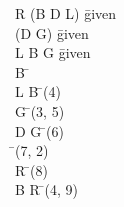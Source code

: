 \documentclass{article}
\begin{document}
\begin{proofbox}
\: R \rightarrow (B \rightarrow D \lor L) \= \hbox{given} \\
\: \lnot (D \lor G) \= \hbox{given} \\
\: L \lor B \rightarrow G \= \hbox{given} \\
\open
\: B \= \asm \\
\: L \lor B \= \orintro(4) \\
\: G \= \implieselim(3, 5) \\
\: D \lor G \= \orintro(6) \\
\: \bot \= \bottomintro(7, 2) \\
\: \lnot R \= \bottomelim(8) \\
\close
\: B \rightarrow \lnot R \= \impliesintro(4, 9) \\
\end{proofbox}
\end{document}

